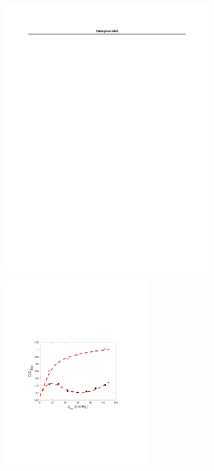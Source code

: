 \documentclass[../main.tex]{article}
\begin{document}
		\begin{figure}[t!]
	\begin{center}
		\begin{subfigure}{\textwidth}
			\centering
			\includegraphics[trim={1.25in 9.75in 1.25in 0.875in},clip]{Subepicardial.pdf}
		\end{subfigure}
		\begin{subfigure}{0.45\textwidth}
			\centering
			\includegraphics[width=2.5in,trim={3.25cm 8cm 4cm 8cm},clip]{A_subepi.pdf}

\end{subfigure}
\end{center}
\end{figure}
\end{document}

